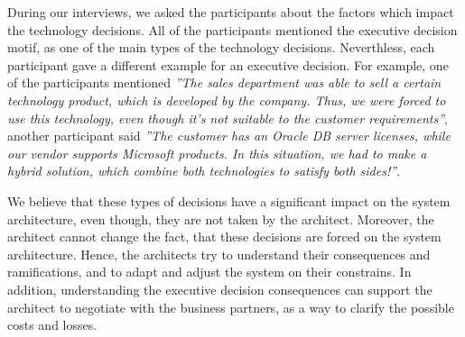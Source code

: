 \documentclass[conference]{IEEEtran}
\begin{document}
During our interviews, we asked the participants about the factors which impact
the technology decisions. All of the participants mentioned the executive
decision motif, as one of the main types of the technology decisions.
Neverthless, each participant gave a different example for an executive
decision. For example, one of the participants mentioned \textit{''The sales
department was able to sell a certain technology product, which is developed by
the company. Thus, we were forced to use this technology, even though it's not
suitable to the customer requirements''}, another participant said \textit{''The
customer has an Oracle DB server licenses, while our vendor supports Microsoft products.
In this situation, we had to make a hybrid solution, which combine both
technologies to satisfy both sides!''}.

We believe that these types of decisions have a significant impact on the system
architecture, even though, they are not taken by the architect. Moreover, the
architect cannot change the fact, that these decisions are forced on the system
architecture. Hence, the architects try to understand their consequences and
ramifications, and to adapt and adjust the system on their constrains. In
addition, understanding the executive decision consequences can support the
architect to negotiate with the business partners, as a way to clarify the
possible costs and losses.
\end{document}
